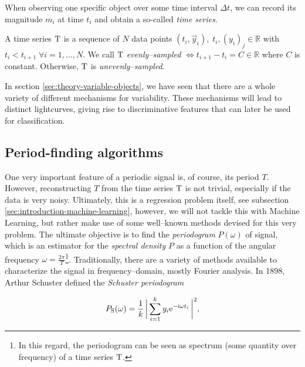 When observing one specific object over some time interval $\Delta t$, we can record its magnitude $m_i$ at time $t_i$ and obtain a so-called \emph{time series}.

\begin{definition}
A time series $\mathrm{T}$ is a sequence of $N$ data points $(t_i, \vec y_i),\; t_i,(y_i)_j \in \mathbb{R}$ with $t_i < t_{i+1} \; \forall i = 1,\ldots,N$. We call $\mathrm{T}$ \emph{evenly--sampled} $\Leftrightarrow t_{i+1} - t_i = C \in \mathbb{R}$ where $C$ is constant. Otherwise, $\mathrm{T}$ is \emph{unevenly--sampled}.
\end{definition}

In section \ref{sec:theory-variable-objects}, we have seen that there are a whole variety of different mechanisms for variability. These mechanisms will lead to distinct lightcurves, giving rise to discriminative features that can later be used for classification.

\subsection{Period-finding algorithms}

One very important feature of a periodic signal is, of course, its period $T$. However, reconstructing $T$ from the time series $\mathrm{T}$ is not trivial, especially if the data is very noisy. Ultimately, this is a regression problem itself, see subsection \ref{sec:introduction-machine-learning}, however, we will not tackle this with Machine Learning, but rather make use of some well--known methods devised for this very problem. The ultimate objective is to find the \emph{periodogram} $P(\omega)$ of signal, which is an estimator for the \emph{spectral density} $P$ as a function of the angular frequency $\omega = \frac{2 \pi}{T}$\footnote{In this regard, the periodogram can be seen as spectrum (some quantity over frequency) of a time series $\mathrm{T}$.}. Traditionally, there are a variety of methods available to characterize the signal in frequency--domain, mostly Fourier analysis. In 1898, Arthur Schuster defined the \emph{Schuster periodogram}

\begin{equation}
\label{eg:schuster-periodogram}
P_{\text{S}}(\omega) = \frac{1}{k} \, \biggl| \, \sum\limits_{i=1}^{k} y_i \mathrm{e}^{-\mathrm{i} \omega t_i} \, \biggr|^2,
\end{equation}


